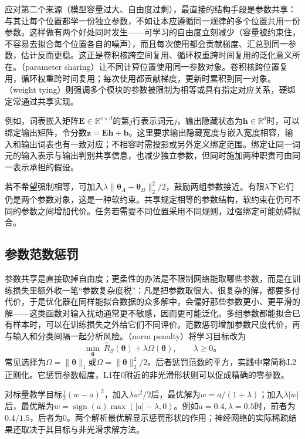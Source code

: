 应对第二个来源（模型容量过大、自由度过剩），最直接的结构手段是参数共享：与其让每个位置都学一份独立参数，不如让本应遵循同一规律的多个位置共用一份参数。这样做有两个好处同时发生——可学习的自由度立刻减少（容量被约束住，不容易去拟合每个位置各自的噪声），而且每次使用都会贡献梯度、汇总到同一参数，估计反而更稳。这正是卷积核跨空间复用、循环权重跨时间复用的泛化意义所在。（parameter sharing）让不同计算位置使用同一参数对象。卷积核跨位置复用，循环权重跨时间复用；每次使用都贡献梯度，更新时累积到同一对象。（weight tying）则强调多个模块的参数被限制为相等或具有指定对应关系，硬绑定常通过共享实现。

例如，词表嵌入矩阵$\bm E\in\mathbb R^{v\times d}$的第$j$行表示词元$j$，输出隐藏状态为$\bm h\in\mathbb R^d$时，可以绑定输出矩阵，令分数$\bm z=\bm E\bm h+\bm b$。这里要求输出隐藏宽度与嵌入宽度相容，输入和输出词表也有一致对应；不相容时需投影或另外定义绑定范围。绑定让同一词元的输入表示与输出判别共享信息，也减少独立参数，但同时施加两种职责可由同一表示承担的假设。

若不希望强制相等，可加入$\lambda\lVert\bm\theta_A-\bm\theta_B\rVert_2^2/2$，鼓励两组参数接近。有限$\lambda$下它们仍是两个参数对象，这是一种软约束。共享规定相等的参数结构，软约束在仍可不同的参数之间增加代价。任务若需要不同位置采用不同规则，过强绑定可能妨碍拟合。

\subsection{参数范数惩罚}
\label{sec:generalization-norm-penalties}

参数共享是直接砍掉自由度；更柔性的办法是不限制网络能取哪些参数，而是在训练损失里额外收一笔“参数复杂度税”：凡是把参数取很大、很复杂的解，都要多付代价，于是优化器在同样能拟合数据的众多解中，会偏好那些参数更小、更平滑的解——这类函数对输入扰动通常更不敏感，因而更可能泛化。多组参数都能拟合已有样本时，可以在训练损失之外给它们不同评价。范数惩罚增加参数尺度代价，再与输入和分类间隔一起分析风险。（norm penalty）将学习目标改为
\begin{equation}
  \min_{\bm\theta}\ \hat R_S(\bm\theta)+\lambda\Omega(\bm\theta),
  \qquad\lambda\geq0\text{。}
  \label{eq:generalization-regularized-objective}
\end{equation}
常见选择为$\Omega=\lVert\bm\theta\rVert_1$或$\Omega=\lVert\bm\theta\rVert_2^2/2$。后者惩罚范数的平方，实践中常简称L2正则化。它惩罚参数幅度，L1在0附近的非光滑形状则可以促成精确的零参数。

\begin{example}[L1与L2的收缩不同]
  \label{ex:generalization-shrinkage}
  对标量教学目标$\tfrac12(w-a)^2$，加入$\lambda w^2/2$后，最优解为$w=a/(1+\lambda)$；加入$\lambda|w|$后，最优解为$w=\operatorname{sign}(a)\max(|a|-\lambda,0)$。例如$a=0.4,\lambda=0.5$时，前者为$0.4/1.5$，后者为0。两个解析最优解显示惩罚形状的作用；神经网络的实际稀疏结果还取决于其目标与非光滑求解方法。
\end{example}

